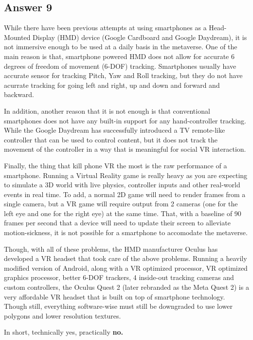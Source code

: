 \documentclass[
  11pt, %
]{assignment}
\begin{document}
\subsection*{Answer 9}

While there have been previous attempts at using smartphones as a Head-Mounted Display (HMD) device (Google Cardboard and Google Daydream), it is not immersive enough to be used at a daily basis in the metaverse. One of the main reason is that, smartphone powered HMD does not allow for accurate 6 degrees of freedom of movement (6-DOF) tracking. Smartphones usually have accurate sensor for tracking Pitch, Yaw and Roll tracking, but they do not have acurrate tracking for going left and right, up and down and forward and backward.

In addition, another reason that it is not enough is that conventional smartphones does not have any built-in support for any hand-controller tracking. While the Google Daydream has successfully introduced a TV remote-like controller that can be used to control content, but it does not track the movement of the controller in a way that is meaningful for social VR interaction.

Finally, the thing that kill phone VR the most is the raw performance of a smartphone. Running a Virtual Reality game is really heavy as you are expecting to simulate a 3D world with live physics, controller inputs and other real-world events in real time. To add, a normal 2D game will need to render frames from a single camera, but a VR game will require output from 2 cameras (one for the left eye and one for the right eye) at the same time. That, with a baseline of 90 frames per second that a device will need to update their screen to alleviate motion-sickness, it is not possible for a smartphone to accomodate the metaverse.

Though, with all of these problems, the HMD manufacturer Oculus has developed a VR headset that took care of the above problems. Running a heavily modified version of Android, along with a VR optimized processor, VR optimized graphics processor, better 6-DOF trackers, 4 inside-out tracking cameras and custom controllers, the Oculus Quest 2 (later rebranded as the Meta Quest 2) is a very affordable VR headset that is built on top of smartphone technology. Though still, everything software-wise must still be downgraded to use lower polygons and lower resolution textures.

\medskip

In short, technically yes, practically \textbf{no.}

\newpage

\newpage
\end{document}
